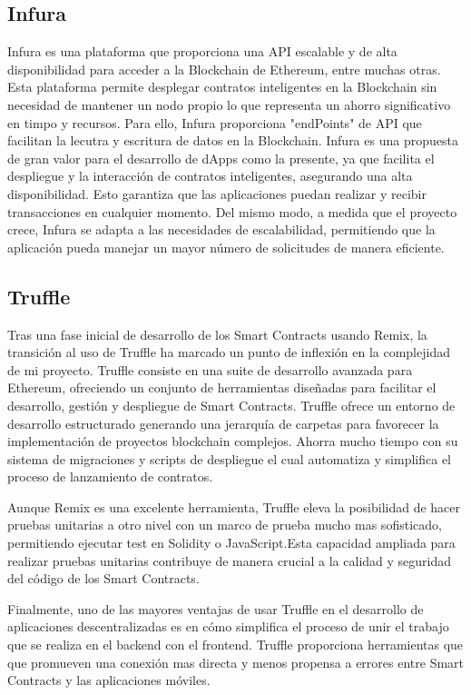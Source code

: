 \subsection{Infura}

Infura es una plataforma que proporciona una API escalable y de alta disponibilidad para acceder a la Blockchain de Ethereum, entre muchas otras.
Esta plataforma permite desplegar contratos inteligentes en la Blockchain sin necesidad de mantener un nodo propio lo que representa un ahorro significativo en timpo y recursos.
Para ello, Infura proporciona "endPoints" de API que facilitan la lecutra y escritura de datos en la Blockchain.
Infura es una propuesta de gran valor para el desarrollo de dApps como la presente, ya que facilita el despliegue y la interacción de contratos inteligentes, asegurando una alta disponibilidad. Esto garantiza que las aplicaciones puedan realizar y recibir transacciones en cualquier momento.
Del mismo modo, a medida que el proyecto crece, Infura se adapta a las necesidades de escalabilidad, permitiendo que la aplicación pueda manejar un mayor número de solicitudes de manera eficiente.


\subsection{Truffle}

Tras una fase inicial de desarrollo de los Smart Contracts usando Remix, la transición al uso de Truffle ha marcado un punto de inflexión en la complejidad de mi proyecto.
Truffle consiste en una suite de desarrollo avanzada para Ethereum, ofreciendo un conjunto de herramientas diseñadas para facilitar el desarrollo, gestión y despliegue de Smart Contracts.
Truffle ofrece un entorno de desarrollo estructurado generando una jerarquía de carpetas para favorecer la implementación de proyectos blockchain complejos.
Ahorra mucho tiempo con su sistema de migraciones y scripts de despliegue el cual automatiza y simplifica el proceso de lanzamiento de contratos.

Aunque Remix es una excelente herramienta, Truffle eleva la posibilidad de hacer pruebas unitarias a otro nivel con un marco de prueba mucho mas sofisticado, permitiendo ejecutar test en Solidity o JavaScript.Esta capacidad ampliada para realizar pruebas unitarias contribuye de manera crucial a la calidad y seguridad del código de los Smart Contracts.

Finalmente, uno de las mayores ventajas de usar Truffle en el desarrollo de aplicaciones descentralizadas es en cómo simplifica el proceso de unir el trabajo que se realiza en el backend con el frontend. Truffle proporciona herramientas que que promueven una conexión mas directa y menos propensa a errores entre Smart Contracts y las aplicaciones móviles.


